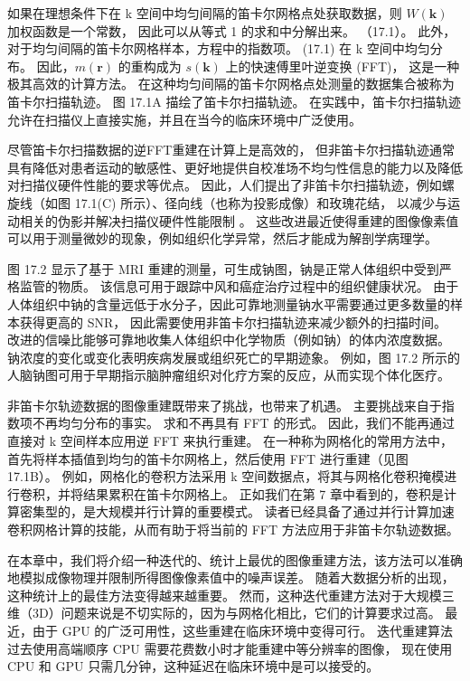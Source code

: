 如果在理想条件下在 k 空间中均匀间隔的笛卡尔网格点处获取数据，则 $W(\mathbf{k})$ 加权函数是一个常数，
因此可以从等式 1 的求和中分解出来。 （17.1）。 此外，对于均匀间隔的笛卡尔网格样本，方程中的指数项。 
(17.1) 在 k 空间中均匀分布。 因此，$m(\mathbf{r})$ 的重构成为 $s(\mathbf{k})$ 上的快速傅里叶逆变换 (FFT)，
这是一种极其高效的计算方法。 在这种均匀间隔的笛卡尔网格点处测量的数据集合被称为笛卡尔扫描轨迹。 
图 17.1A 描绘了笛卡尔扫描轨迹。 在实践中，笛卡尔扫描轨迹允许在扫描仪上直接实施，并且在当今的临床环境中广泛使用。

尽管笛卡尔扫描数据的逆FFT重建在计算上是高效的，
但非笛卡尔扫描轨迹通常具有降低对患者运动的敏感性、更好地提供自校准场不均匀性信息的能力以及降低对扫描仪硬件性能的要求等优点。 
因此，人们提出了非笛卡尔扫描轨迹，例如螺旋线（如图 17.1(C) 所示）、径向线（也称为投影成像）和玫瑰花结，
以减少与运动相关的伪影并解决扫描仪硬件性能限制 。 
这些改进最近使得重建的图像像素值可以用于测量微妙的现象，例如组织化学异常，然后才能成为解剖学病理学。

图 17.2 显示了基于 MRI 重建的测量，可生成钠图，钠是正常人体组织中受到严格监管的物质。 
该信息可用于跟踪中风和癌症治疗过程中的组织健康状况。 
由于人体组织中钠的含量远低于水分子，因此可靠地测量钠水平需要通过更多数量的样本获得更高的 SNR，
因此需要使用非笛卡尔扫描轨迹来减少额外的扫描时间。 
改进的信噪比能够可靠地收集人体组织中化学物质（例如钠）的体内浓度数据。 
钠浓度的变化或变化表明疾病发展或组织死亡的早期迹象。 
例如，图 17.2 所示的人脑钠图可用于早期指示脑肿瘤组织对化疗方案的反应，从而实现个体化医疗。

非笛卡尔轨迹数据的图像重建既带来了挑战，也带来了机遇。 主要挑战来自于指数项不再均匀分布的事实。 
求和不再具有 FFT 的形式。 因此，我们不能再通过直接对 k 空间样本应用逆 FFT 来执行重建。 
在一种称为网格化的常用方法中，首先将样本插值到均匀的笛卡尔网格上，然后使用 FFT 进行重建（见图 17.1B）。 
例如，网格化的卷积方法采用 k 空间数据点，将其与网格化卷积掩模进行卷积，并将结果累积在笛卡尔网格上。 
正如我们在第 7 章中看到的，卷积是计算密集型的，是大规模并行计算的重要模式。 
读者已经具备了通过并行计算加速卷积网格计算的技能，从而有助于将当前的 FFT 方法应用于非笛卡尔轨迹数据。

在本章中，我们将介绍一种迭代的、统计上最优的图像重建方法，该方法可以准确地模拟成像物理并限制所得图像像素值中的噪声误差。 
随着大数据分析的出现，这种统计上的最佳方法变得越来越重要。 
然而，这种迭代重建方法对于大规模三维（3D）问题来说是不切实际的，因为与网格化相比，它们的计算要求过高。 
最近，由于 GPU 的广泛可用性，这些重建在临床环境中变得可行。 
迭代重建算法过去使用高端顺序 CPU 需要花费数小时才能重建中等分辨率的图像，
现在使用 CPU 和 GPU 只需几分钟，这种延迟在临床环境中是可以接受的。

